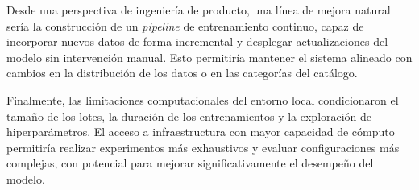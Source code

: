 Desde una perspectiva de ingeniería de producto, una línea de mejora natural sería la construcción de un \textit{pipeline} de entrenamiento continuo, capaz de incorporar nuevos datos de forma incremental y desplegar actualizaciones del modelo sin intervención manual. Esto permitiría mantener el sistema alineado con cambios en la distribución de los datos o en las categorías del catálogo.

Finalmente, las limitaciones computacionales del entorno local condicionaron el tamaño de los lotes, la duración de los entrenamientos y la exploración de hiperparámetros. El acceso a infraestructura con mayor capacidad de cómputo permitiría realizar experimentos más exhaustivos y evaluar configuraciones más complejas, con potencial para mejorar significativamente el desempeño del modelo.
